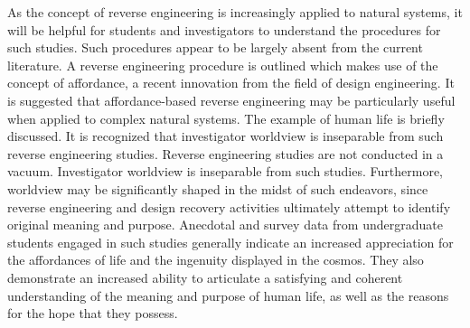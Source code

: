 As the concept of reverse engineering is increasingly applied to natural
systems, it will be helpful for students and investigators to
understand the procedures for such studies. Such procedures appear to
be largely absent from the current literature. A reverse engineering
procedure is outlined which makes use of the concept of affordance, a
recent innovation from the field of design engineering. It is suggested
that affordance-based reverse engineering may be particularly useful
when applied to complex natural systems. The example of human life is
briefly discussed. It is recognized that investigator worldview is
inseparable from such reverse engineering studies. Reverse engineering
studies are not conducted in a vacuum. Investigator worldview is
inseparable from such studies. Furthermore, worldview may be
significantly shaped in the midst of such endeavors, since reverse
engineering and design recovery activities ultimately attempt to
identify original meaning and purpose. Anecdotal and survey data from
undergraduate students engaged in such studies generally indicate an
increased appreciation for the affordances of life and the ingenuity
displayed in the cosmos. They also demonstrate an increased ability to
articulate a satisfying and coherent understanding of the meaning and
purpose of human life, as well as the reasons for the hope that they
possess.




